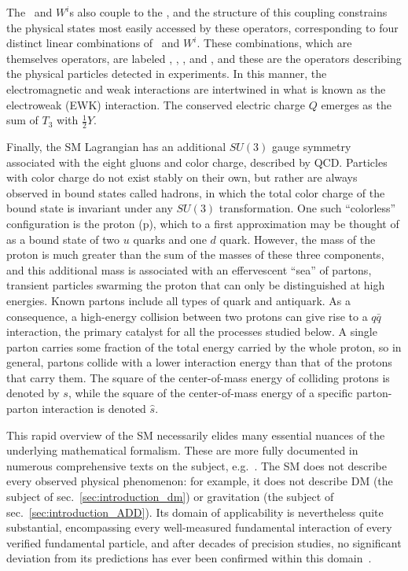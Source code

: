 \documentclass[oneside, letterpaper, 12pt, oldfontcommands]{memoir}
\begin{document}
The \PB\ and $W^{i}$s also couple to the \PH, and the structure of this coupling constrains the physical states
most easily accessed by these operators, corresponding to four distinct linear combinations of
\PB\ and $W^{i}$. These combinations, which are themselves operators, are labeled \PZ, \Pgamma, \PWplus, and \PWminus,
and these are the operators describing the physical particles detected in experiments.
In this manner, the electromagnetic and weak interactions are intertwined in what is known as the electroweak (EWK) interaction.
The conserved electric charge $Q$ emerges as the sum of $T_{3}$ with $\frac{1}{2}Y$.

Finally, the SM Lagrangian has an additional $SU(3)$ gauge symmetry associated with the eight gluons and color charge, described by QCD.
Particles with color charge do not exist stably on their own, but rather are always observed in bound states called hadrons, in which the total color
charge of the bound state is invariant under any $SU(3)$ transformation. One such ``colorless'' configuration is the proton (p), which
to a first approximation may be thought of as a bound state of two $u$ quarks and one $d$ quark. However, the mass of the proton is
much greater than the sum of the masses of these three components, and this additional mass is associated with an effervescent ``sea''
of partons, transient particles swarming the proton that can only be distinguished at high energies. Known partons include
all types of quark and antiquark. As a consequence, a high-energy collision between two protons can give rise to a $q\bar{q}$ interaction,
the primary catalyst for all the processes studied below. A single parton carries some fraction of the total energy carried by the whole proton,
so in general, partons collide with a lower interaction energy than that of the protons that carry them.
The square of the center-of-mass energy of colliding protons is denoted by $s$, while the square of the center-of-mass energy of a specific
parton-parton interaction is denoted $\hat{s}$.

This rapid overview of the SM necessarily elides many essential nuances of the underlying mathematical formalism. These are more fully
documented in numerous comprehensive texts on the subject, e.g.~\cite{ref:HalzenMartin, ref:BargerPhillips, ref:PeskinSchroeder, ref:Srednicki, ref:Schwartz}.
The SM does not describe every observed physical phenomenon: for example, it does not describe DM (the subject of sec.~\ref{sec:introduction_dm})
or gravitation (the subject of sec.~\ref{sec:introduction_ADD}). Its domain of applicability is nevertheless quite substantial, encompassing
every well-measured fundamental interaction of every verified fundamental particle, and after decades of precision studies, no significant deviation from
its predictions has ever been confirmed within this domain~\cite{ref:PDG}.
\end{document}
